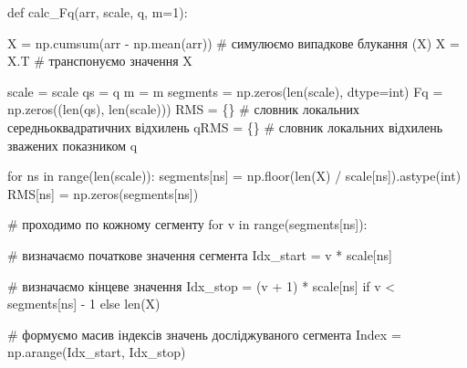 \documentclass[
  letterpaper,
]{report}
\newenvironment{Shaded}{\begin{snugshade}}{\end{snugshade}}
\newcommand{\BuiltInTok}[1]{\textcolor[rgb]{0.00,0.23,0.31}{#1}}
\newcommand{\CommentTok}[1]{\textcolor[rgb]{0.37,0.37,0.37}{#1}}
\newcommand{\ControlFlowTok}[1]{\textcolor[rgb]{0.00,0.23,0.31}{#1}}
\newcommand{\DecValTok}[1]{\textcolor[rgb]{0.68,0.00,0.00}{#1}}
\newcommand{\KeywordTok}[1]{\textcolor[rgb]{0.00,0.23,0.31}{#1}}
\newcommand{\NormalTok}[1]{\textcolor[rgb]{0.00,0.23,0.31}{#1}}
\newcommand{\OperatorTok}[1]{\textcolor[rgb]{0.37,0.37,0.37}{#1}}
\begin{document}
\begin{Shaded}
\begin{Highlighting}[]
\KeywordTok{def}\NormalTok{ calc\_Fq(arr, scale, q, m}\OperatorTok{=}\DecValTok{1}\NormalTok{):}
    
\NormalTok{    X }\OperatorTok{=}\NormalTok{ np.cumsum(arr }\OperatorTok{{-}}\NormalTok{ np.mean(arr)) }\CommentTok{\# симулюємо випадкове блукання (X)}
\NormalTok{    X }\OperatorTok{=}\NormalTok{ X.T                           }\CommentTok{\# транспонуємо значення X}

\NormalTok{    scale }\OperatorTok{=}\NormalTok{ scale }
\NormalTok{    qs }\OperatorTok{=}\NormalTok{ q}
\NormalTok{    m }\OperatorTok{=}\NormalTok{ m}
\NormalTok{    segments }\OperatorTok{=}\NormalTok{ np.zeros(}\BuiltInTok{len}\NormalTok{(scale), dtype}\OperatorTok{=}\BuiltInTok{int}\NormalTok{)}
\NormalTok{    Fq }\OperatorTok{=}\NormalTok{ np.zeros((}\BuiltInTok{len}\NormalTok{(qs), }\BuiltInTok{len}\NormalTok{(scale)))}
\NormalTok{    RMS }\OperatorTok{=}\NormalTok{ \{\}    }\CommentTok{\# словник локальних середньоквадратичних відхилень}
\NormalTok{    qRMS }\OperatorTok{=}\NormalTok{ \{\}   }\CommentTok{\# словник локальних відхилень зважених показником q}

    \ControlFlowTok{for}\NormalTok{ ns }\KeywordTok{in} \BuiltInTok{range}\NormalTok{(}\BuiltInTok{len}\NormalTok{(scale)):}
\NormalTok{        segments[ns] }\OperatorTok{=}\NormalTok{ np.floor(}\BuiltInTok{len}\NormalTok{(X) }\OperatorTok{/}\NormalTok{ scale[ns]).astype(}\BuiltInTok{int}\NormalTok{)}
\NormalTok{        RMS[ns] }\OperatorTok{=}\NormalTok{ np.zeros(segments[ns])}

        \CommentTok{\# проходимо по кожному сегменту}
        \ControlFlowTok{for}\NormalTok{ v }\KeywordTok{in} \BuiltInTok{range}\NormalTok{(segments[ns]): }

            \CommentTok{\# визначаємо початкове значення сегмента}
\NormalTok{            Idx\_start }\OperatorTok{=}\NormalTok{ v }\OperatorTok{*}\NormalTok{ scale[ns]  }
                       
            \CommentTok{\# визначаємо кінцеве значення}
\NormalTok{            Idx\_stop }\OperatorTok{=}\NormalTok{ (v }\OperatorTok{+} \DecValTok{1}\NormalTok{) }\OperatorTok{*}\NormalTok{ scale[ns] }\ControlFlowTok{if}\NormalTok{ v }\OperatorTok{\textless{}}\NormalTok{ segments[ns] }\OperatorTok{{-}} \DecValTok{1} \ControlFlowTok{else} \BuiltInTok{len}\NormalTok{(X)    }
            
            \CommentTok{\# формуємо масив індексів значень досліджуваного сегмента}
\NormalTok{            Index }\OperatorTok{=}\NormalTok{ np.arange(Idx\_start, Idx\_stop)  }


\end{Highlighting}
\end{Shaded}
\end{document}
